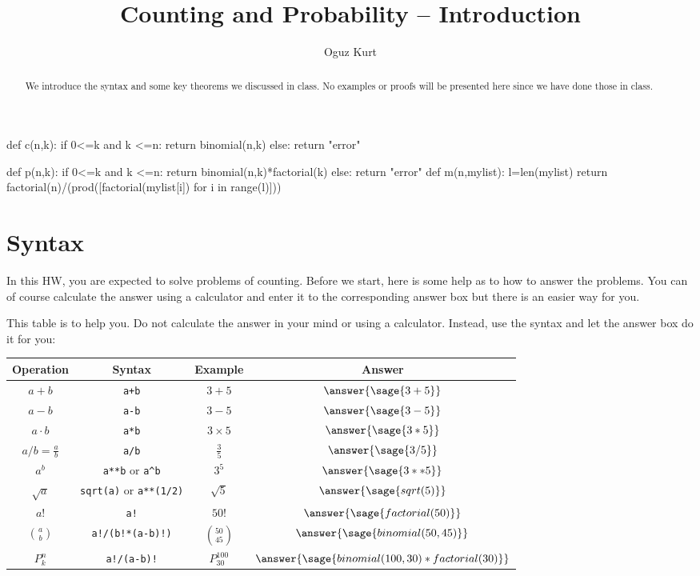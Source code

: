 \documentclass{ximera}
\title{Counting and Probability -- Introduction}
\author{Oguz Kurt}
\begin{document}
\begin{abstract}
We introduce the syntax and some key theorems we discussed in class. No examples or proofs will be presented here since we have done those in class.
\end{abstract}
\maketitle

\begin{sagesilent}
def c(n,k):
    if 0<=k and k <=n:
        return binomial(n,k)
    else:
        return "error"

def p(n,k):
    if 0<=k and k <=n:
        return binomial(n,k)*factorial(k)
    else:
        return "error"
def m(n,mylist):
    l=len(mylist)
    return factorial(n)/(prod([factorial(mylist[i]) for i in range(l)]))
\end{sagesilent}

\section*{Syntax}
In this HW, you are expected to solve problems of counting. Before we start, here is some help as to how to answer the problems. You can of course calculate the answer using a calculator and enter it to the corresponding answer box but there is an easier way for you. 

\hspace{0.5cm}

\begin{exercise} This table is to help you. Do not calculate the answer in your mind or using a calculator. Instead, use the syntax and let the answer box do it for you:

\begin{tabular}{c|c|c|c}
Operation & Syntax & Example & Answer 
\\
\hline
$a+b$ & {\color{red} \verb|a+b|} & $3+5$ & $\answer{\sage{3+5} }$
\\
\hline
$a- b$ & {\color{red} \verb|a-b|} & $3-5$ & $\answer{\sage{3-5} }$
\\
\hline
$a\cdot b$ & {\color{red} \verb|a*b| } & $3\times 5$ & $\answer{\sage{3*5} }$
\\
\hline
$a/b=\frac{a}{b}$ & {\color{red} \verb|a/b|} & $\frac{3}{5}$ & $\answer{\sage{3/5} }$
\\
\hline
$a^b$ & {\color{red} \verb|a**b| or \verb|a^b|} & $3^5$ & $\answer{\sage{3**5} }$
\\
\hline
$\sqrt{a}$ & {\color{red} \verb|sqrt(a)| or \verb|a**(1/2)|} & $\sqrt{5}$ & $\answer{\sage{sqrt(5)} }$
\\
\hline
$a!$ & {\color{red} \verb|a!|} & $50!$ & $\answer{\sage{factorial(50)} }$
\\
\hline
$\binom{a}{b}$ & {\color{red} \verb|a!/(b!*(a-b)!)|} & $\binom{50}{45}$ & $\answer{\sage{binomial(50,45)}}$ 
\\
\hline
$P_k^n$ & {\color{red} \verb|a!/(a-b)!|} & $P_{30}^{100}$ & $\answer{\sage{binomial(100,30)*factorial(30)} }$ 
\\
\end{tabular}
\end{exercise}
\end{document}
